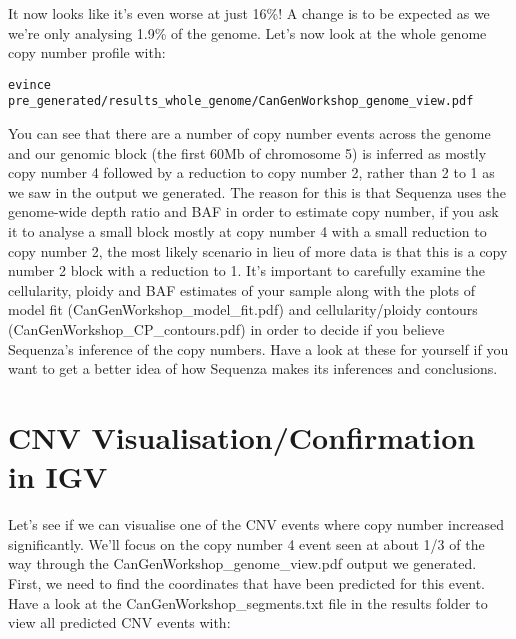 It now looks like it's even worse at just 16\%! A change is to be expected as we we're only analysing 1.9\% of the genome. Let's now look at the whole genome copy number profile with:

\begin{steps}
\begin{lstlisting}
evince pre_generated/results_whole_genome/CanGenWorkshop_genome_view.pdf
\end{lstlisting}
\end{steps}

You can see that there are a number of copy number events across the genome and our genomic block (the first 60Mb of chromosome 5) is inferred as mostly copy number 4 followed by a reduction to copy number 2, rather than 2 to 1 as we saw in the output we generated. The reason for this is that Sequenza uses the genome-wide depth ratio and BAF in order to estimate copy number, if you ask it to analyse a small block mostly at copy number 4 with a small reduction to copy number 2, the most likely scenario in lieu of more data is that this is a copy number 2 block with a reduction to 1. It's important to carefully examine the cellularity, ploidy and BAF estimates of your sample along with the plots of model fit (CanGenWorkshop_model_fit.pdf) and cellularity/ploidy contours (CanGenWorkshop_CP_contours.pdf) in order to decide if you believe Sequenza's inference of the copy numbers. Have a look at these for yourself if you want to get a better idea of how Sequenza makes its inferences and conclusions.


\newpage


\section{CNV Visualisation/Confirmation in IGV}

Let's see if we can visualise one of the CNV events where copy number increased significantly. We'll focus on the copy number 4 event seen at about 1/3 of the way through the CanGenWorkshop\_genome\_view.pdf output we generated. First, we need to find the coordinates that have been predicted for this event. Have a look at the CanGenWorkshop\_segments.txt file in the results folder to view all predicted CNV events with:

